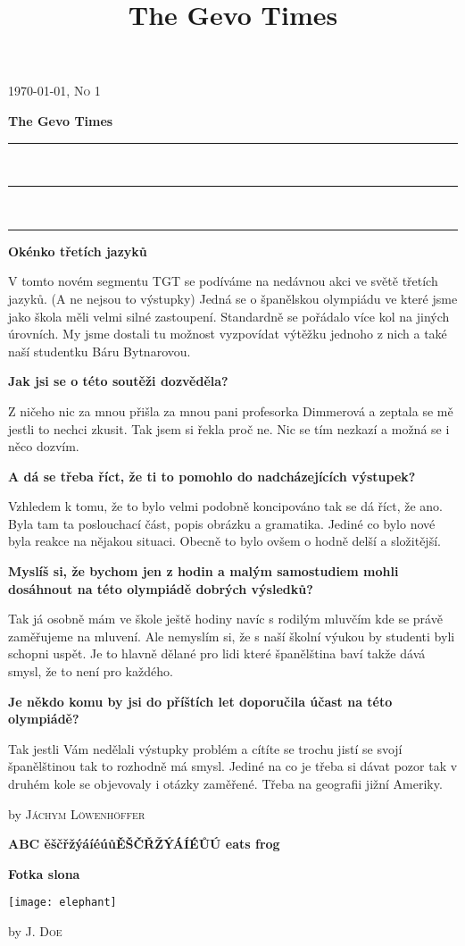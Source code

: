 \documentclass[11pt,a4paper]{article}
\title{The Gevo Times}
\newcommand{\HorRule}[1]{\noindent\rule{\linewidth}{#1}} %
\newcommand{\JournalName}[1]{%
		\begin{center}	
			\bfseries \Huge {The Gevo Times}
		\end{center}	
		\par \normalsize \normalfont}
\newcommand{\JournalIssue}[1]{%
		\hfill \textsc{\mydate \today, No #1} %
		\par \normalsize \normalfont}
\newcommand{\Nadpis}[1]{%
		\begin{center}
		{\bfseries	
		\Large #1 \vspace{4pt}
		\par \normalsize \normalfont}
		\end{center}}
\newcommand{\Podnadpis}[1]{
	\begin{center}
	{
		\bfseries	
		\color{gray}
		\large #1 \vspace{2pt}
		\normalsize \normalfont
	}
	\end{center}
}
\newcommand{\NewsAuthor}[1]{
	\bigbreak
	\hfill by \textsc{#1} \vspace{4pt}
	\par 
	\normalfont
}
\begin{document}
\JournalIssue{1}
\JournalName{The Gevo Times}
\noindent
{\color{gray} \rule{\linewidth}{1pt}} \\[-0.5\baselineskip]
\noindent\HorRule{3pt} \\[-0.63\baselineskip]
\noindent
{\color{gray} \rule{\linewidth}{1pt}} 
\begin{multicols}{2}
	\setlength{\columnseprule}{1pt}
	
\Nadpis{Okénko třetích jazyků}

V tomto novém segmentu TGT se podíváme na
nedávnou akci ve světě třetích jazyků. (A ne
nejsou to výstupky) Jedná se o španělskou
olympiádu ve které jsme jako škola měli velmi
silné zastoupení. Standardně se pořádalo více
kol na jiných úrovních. My jsme dostali tu
možnost vyzpovídat výtěžku jednoho z nich a
také naší studentku Báru Bytnarovou.

\Podnadpis{Jak jsi se o této soutěži dozvěděla?}

Z ničeho nic za mnou přišla za mnou pani
profesorka Dimmerová a zeptala se mě jestli to
nechci zkusit. Tak jsem si řekla proč ne. Nic se
tím nezkazí a možná se i něco dozvím.

\Podnadpis{A dá se třeba říct, že ti to pomohlo do nadcházejících výstupek?}

Vzhledem k tomu, že to bylo velmi podobně
koncipováno tak se dá říct, že ano. Byla tam ta
poslouchací část, popis obrázku a gramatika.
Jediné co bylo nové byla reakce na nějakou
situaci. Obecně to bylo ovšem o hodně delší a
složitější.

\Podnadpis{Myslíš si, že bychom jen z hodin a malým samostudiem mohli dosáhnout na této olympiádě dobrých výsledků?}

Tak já osobně mám ve škole ještě hodiny navíc s
rodilým mluvčím kde se právě zaměřujeme na
mluvení. Ale nemyslím si, že s naší školní výukou
by studenti byli schopni uspět. Je to hlavně
dělané pro lidi které španělština baví takže dává
smysl, že to není pro každého.

\Podnadpis{Je někdo komu by jsi do příštích let doporučila účast na této olympiádě?}
Tak jestli Vám nedělali výstupky problém a cítíte se trochu jistí se svojí španělštinou tak to rozhodně má smysl. Jediné na co je třeba si dávat pozor tak v druhém kole se objevovaly i otázky zaměřené. Třeba na geografii jižní Ameriky.

\NewsAuthor{Jáchym Löwenhöffer}

\vspace{4ex}

\Nadpis{ABC ěščřžýáíéúůĚŠČŘŽÝÁÍÉŮÚ eats frog}
\blindtext[1]
\Podnadpis{Fotka slona}
	\begin{center}
		\texttt{[image: elephant]}
	\end{center}
\blindtext[1]
\NewsAuthor{J. Doe}
\end{multicols}
\end{document}
